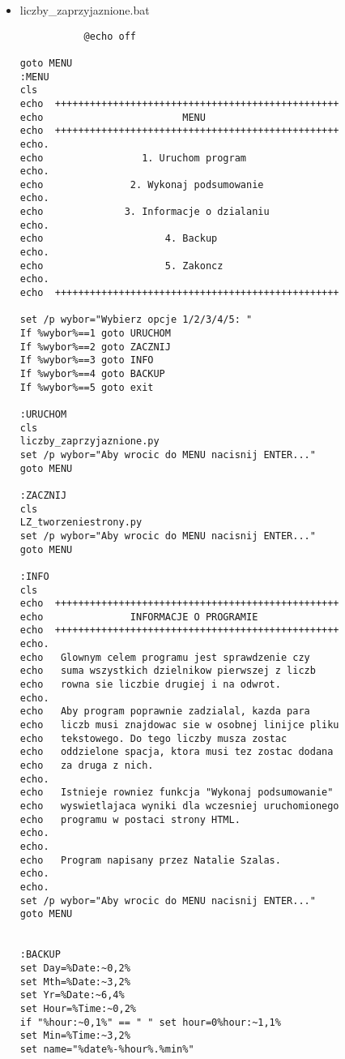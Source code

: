 \documentclass[12pt,a4paper]{article}
\begin{document}
   \begin{itemize}
       \item liczby\_zaprzyjaznione.bat
       \begin{lstlisting}
           @echo off 

goto MENU
:MENU
cls
echo  +++++++++++++++++++++++++++++++++++++++++++++++++
echo                        MENU                      
echo  +++++++++++++++++++++++++++++++++++++++++++++++++
echo.                                   
echo                 1. Uruchom program                    
echo.                                   
echo               2. Wykonaj podsumowanie                
echo.
echo              3. Informacje o dzialaniu 
echo.                                 
echo                     4. Backup                  
echo.                                
echo                     5. Zakoncz                  
echo.                               
echo  +++++++++++++++++++++++++++++++++++++++++++++++++

set /p wybor="Wybierz opcje 1/2/3/4/5: "
If %wybor%==1 goto URUCHOM
If %wybor%==2 goto ZACZNIJ
If %wybor%==3 goto INFO
If %wybor%==4 goto BACKUP
If %wybor%==5 goto exit

:URUCHOM
cls
liczby_zaprzyjaznione.py
set /p wybor="Aby wrocic do MENU nacisnij ENTER..."
goto MENU

:ZACZNIJ
cls
LZ_tworzeniestrony.py
set /p wybor="Aby wrocic do MENU nacisnij ENTER..."
goto MENU

:INFO
cls
echo  +++++++++++++++++++++++++++++++++++++++++++++++++
echo               INFORMACJE O PROGRAMIE
echo  +++++++++++++++++++++++++++++++++++++++++++++++++
echo.
echo   Glownym celem programu jest sprawdzenie czy
echo   suma wszystkich dzielnikow pierwszej z liczb 
echo   rowna sie liczbie drugiej i na odwrot. 
echo.
echo   Aby program poprawnie zadzialal, kazda para 
echo   liczb musi znajdowac sie w osobnej linijce pliku
echo   tekstowego. Do tego liczby musza zostac 
echo   oddzielone spacja, ktora musi tez zostac dodana 
echo   za druga z nich. 
echo.
echo   Istnieje rowniez funkcja "Wykonaj podsumowanie"
echo   wyswietlajaca wyniki dla wczesniej uruchomionego 
echo   programu w postaci strony HTML.
echo.
echo.
echo   Program napisany przez Natalie Szalas.
echo.
echo.  
set /p wybor="Aby wrocic do MENU nacisnij ENTER..."
goto MENU


:BACKUP
set Day=%Date:~0,2%
set Mth=%Date:~3,2%
set Yr=%Date:~6,4%
set Hour=%Time:~0,2%
if "%hour:~0,1%" == " " set hour=0%hour:~1,1%
set Min=%Time:~3,2%
set name="%date%-%hour%.%min%"


\end{lstlisting}
\end{itemize}
\end{document}
